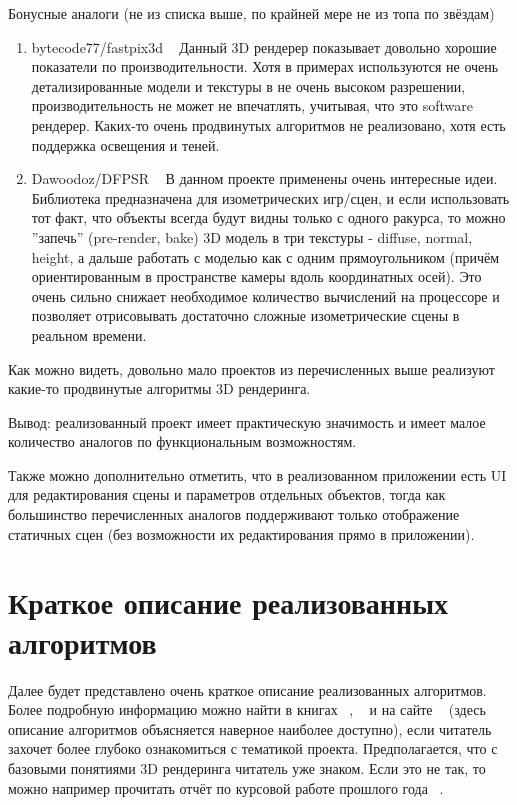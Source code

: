 \documentclass[14pt]{extarticle}
\begin{document}
Бонусные аналоги (не из списка выше, по крайней мере не из топа по звёздам)
\begin{enumerate}
	\item bytecode77/fastpix3d ~\cite{renderer9} Данный 3D рендерер показывает довольно хорошие показатели по производительности. Хотя в примерах используются не очень детализированные модели и текстуры в не очень высоком разрешении, производительность не может не впечатлять, учитывая, что это software рендерер. Каких-то очень продвинутых алгоритмов не реализовано, хотя есть поддержка освещения и теней.
	\item Dawoodoz/DFPSR ~\cite{renderer10} В данном проекте применены очень интересные идеи. Библиотека предназначена для изометрических игр/сцен, и если использовать тот факт, что объекты всегда будут видны только с одного ракурса, то можно ''запечь'' (pre-render, bake) 3D модель в три текстуры - diffuse, normal, height, а дальше работать с моделью как с одним прямоугольником (причём ориентированным в пространстве камеры вдоль координатных осей). Это очень сильно снижает необходимое количество вычислений на процессоре и позволяет отрисовывать достаточно сложные изометрические сцены в реальном времени.
\end{enumerate}

Как можно видеть, довольно мало проектов из перечисленных выше реализуют какие-то продвинутые алгоритмы 3D рендеринга. 

Вывод: реализованный проект имеет практическую значимость и имеет малое количество аналогов по функциональным возможностям. 

Также можно дополнительно отметить, что в реализованном приложении есть UI для редактирования сцены и параметров отдельных объектов, тогда как большинство перечисленных аналогов поддерживают только отображение статичных сцен (без возможности их редактирования прямо в приложении).

\section{Краткое описание реализованных алгоритмов}
Далее будет представлено очень краткое описание реализованных алгоритмов. Более подробную информацию можно найти в книгах ~\cite{LRN}, ~\cite{Math3d} и на сайте ~\cite{learnopengl} (здесь описание алгоритмов объясняется наверное наиболее доступно), если читатель захочет более глубоко ознакомиться с тематикой проекта. Предполагается, что с базовыми понятиями 3D рендеринга читатель уже знаком. Если это не так, то можно например прочитать отчёт по курсовой работе прошлого года ~\cite{year2paper}.
\end{document}
